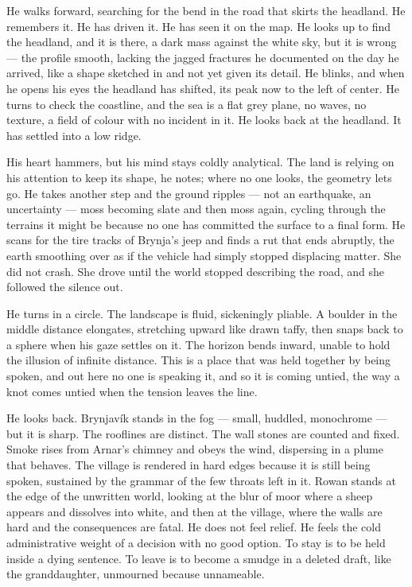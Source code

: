 \documentclass[11pt,oneside]{book}
\begin{document}
He walks forward, searching for the bend in the road that skirts the
headland. He remembers it. He has driven it. He has seen it on the map.
He looks up to find the headland, and it is there, a dark mass against
the white sky, but it is wrong --- the profile smooth, lacking the
jagged fractures he documented on the day he arrived, like a shape
sketched in and not yet given its detail. He blinks, and when he opens
his eyes the headland has shifted, its peak now to the left of center.
He turns to check the coastline, and the sea is a flat grey plane, no
waves, no texture, a field of colour with no incident in it. He looks
back at the headland. It has settled into a low ridge.

His heart hammers, but his mind stays coldly analytical. The land is
relying on his attention to keep its shape, he notes; where no one
looks, the geometry lets go. He takes another step and the ground
ripples --- not an earthquake, an uncertainty --- moss becoming slate
and then moss again, cycling through the terrains it might be because no
one has committed the surface to a final form. He scans for the tire
tracks of Brynja's jeep and finds a rut that ends abruptly, the earth
smoothing over as if the vehicle had simply stopped displacing matter.
She did not crash. She drove until the world stopped describing the
road, and she followed the silence out.

He turns in a circle. The landscape is fluid, sickeningly pliable. A
boulder in the middle distance elongates, stretching upward like drawn
taffy, then snaps back to a sphere when his gaze settles on it. The
horizon bends inward, unable to hold the illusion of infinite distance.
This is a place that was held together by being spoken, and out here no
one is speaking it, and so it is coming untied, the way a knot comes
untied when the tension leaves the line.

He looks back. Brynjavík stands in the fog --- small, huddled,
monochrome --- but it is sharp. The rooflines are distinct. The wall
stones are counted and fixed. Smoke rises from Arnar's chimney and obeys
the wind, dispersing in a plume that behaves. The village is rendered in
hard edges because it is still being spoken, sustained by the grammar of
the few throats left in it. Rowan stands at the edge of the unwritten
world, looking at the blur of moor where a sheep appears and dissolves
into white, and then at the village, where the walls are hard and the
consequences are fatal. He does not feel relief. He feels the cold
administrative weight of a decision with no good option. To stay is to
be held inside a dying sentence. To leave is to become a smudge in a
deleted draft, like the granddaughter, unmourned because unnameable.
\end{document}
